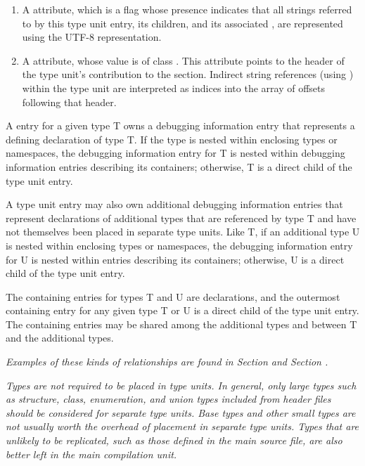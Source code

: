\begin{enumerate}[1. ]
\item A \DWATuseUTFeight{} attribute, which is a flag
whose presence indicates that all strings referred to by this type
unit entry, its children, and its associated 
, 
are represented using the UTF-8 representation.

\item A 
\bb
\DWATstroffsets{}
\eb
attribute, whose value is of class \CLASSstroffsetsptr. 
This attribute points to the 
\bb
header
\eb 
of the type unit's contribution to
the \dotdebugstroffsets{} section. Indirect string references
(using \DWFORMstrxXNor) within the type unit are interpreted
as indices 
\bb
into the array of offsets following that header.
\eb

\end{enumerate}

A  entry for a given type T owns a debugging
information entry that represents a defining declaration
of type T. If the type is nested within enclosing types or
namespaces, the debugging information entry for T is nested
within debugging information entries describing its containers;
otherwise, T is a direct child of the type unit entry.

A type unit entry may also own additional debugging information
entries that represent declarations of additional types that
are referenced by type T and have not themselves been placed in
separate type units. Like T, if an additional type U is nested
within enclosing types or namespaces, the debugging information
entry for U is nested within entries describing its containers;
otherwise, U is a direct child of the type unit entry.

The containing entries for types T and U are declarations,
and the outermost containing entry for any given type T or
U is a direct child of the type unit entry. The containing
entries may be shared among the additional types and between
T and the additional types.

\textit{Examples of these kinds of relationships are found in
Section  and
Section .}

\textit{Types are not required to be placed in type units. In general,
only large types such as structure, class, enumeration, and
union types included from header files should be considered
for separate type units. Base types and other small types
are not usually worth the overhead of placement in separate
type units. Types that are unlikely to be replicated, such
as those defined in the main source file, are also better
left in the main compilation unit.}

